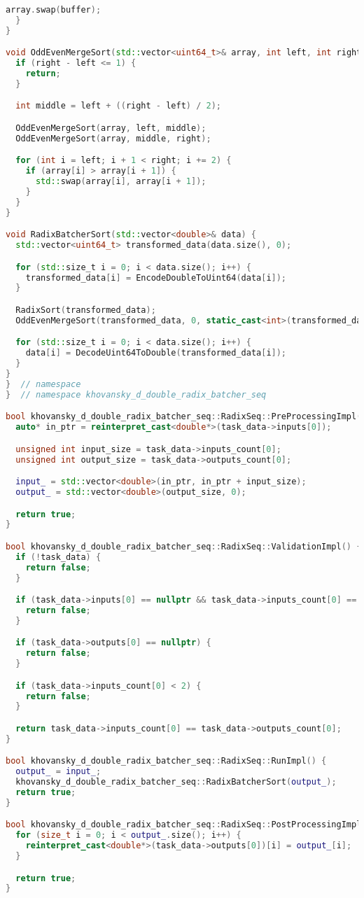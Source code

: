 \documentclass[12pt]{article}
\begin{document}
\begin{lstlisting}[language=C++,
    breaklines=true,       % Автоматический перенос строк
    columns=fullflexible ]
    array.swap(buffer);
  }
}

void OddEvenMergeSort(std::vector<uint64_t>& array, int left, int right) {
  if (right - left <= 1) {
    return;
  }

  int middle = left + ((right - left) / 2);

  OddEvenMergeSort(array, left, middle);
  OddEvenMergeSort(array, middle, right);

  for (int i = left; i + 1 < right; i += 2) {
    if (array[i] > array[i + 1]) {
      std::swap(array[i], array[i + 1]);
    }
  }
}

void RadixBatcherSort(std::vector<double>& data) {
  std::vector<uint64_t> transformed_data(data.size(), 0);

  for (std::size_t i = 0; i < data.size(); i++) {
    transformed_data[i] = EncodeDoubleToUint64(data[i]);
  }

  RadixSort(transformed_data);
  OddEvenMergeSort(transformed_data, 0, static_cast<int>(transformed_data.size()));

  for (std::size_t i = 0; i < data.size(); i++) {
    data[i] = DecodeUint64ToDouble(transformed_data[i]);
  }
}
}  // namespace
}  // namespace khovansky_d_double_radix_batcher_seq

bool khovansky_d_double_radix_batcher_seq::RadixSeq::PreProcessingImpl() {
  auto* in_ptr = reinterpret_cast<double*>(task_data->inputs[0]);

  unsigned int input_size = task_data->inputs_count[0];
  unsigned int output_size = task_data->outputs_count[0];

  input_ = std::vector<double>(in_ptr, in_ptr + input_size);
  output_ = std::vector<double>(output_size, 0);

  return true;
}

bool khovansky_d_double_radix_batcher_seq::RadixSeq::ValidationImpl() {
  if (!task_data) {
    return false;
  }

  if (task_data->inputs[0] == nullptr && task_data->inputs_count[0] == 0) {
    return false;
  }

  if (task_data->outputs[0] == nullptr) {
    return false;
  }

  if (task_data->inputs_count[0] < 2) {
    return false;
  }

  return task_data->inputs_count[0] == task_data->outputs_count[0];
}

bool khovansky_d_double_radix_batcher_seq::RadixSeq::RunImpl() {
  output_ = input_;
  khovansky_d_double_radix_batcher_seq::RadixBatcherSort(output_);
  return true;
}

bool khovansky_d_double_radix_batcher_seq::RadixSeq::PostProcessingImpl() {
  for (size_t i = 0; i < output_.size(); i++) {
    reinterpret_cast<double*>(task_data->outputs[0])[i] = output_[i];
  }

  return true;
}
\end{lstlisting}
\end{document}

